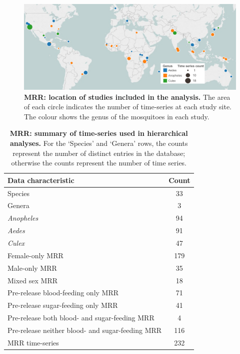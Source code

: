 \documentclass[12pt]{article}
\begin{document}
\begin{figure}[h]
	\centerline{\includegraphics[width=1.25\textwidth]{./Figure_files/mrr_mapGenusCropped.pdf}}
	\caption{\textbf{MRR: location of studies included in the analysis.} The area of each circle indicates the number of time-series at each study site. The colour shows the genus of the mosquitoes in each study.}
	\label{fig:mrr_lifetimes_map}
\end{figure}


\begin{table}[htbp]
	\centering
	\begin{tabular}{lc}
		\toprule
		\textbf{Data characteristic} & \textbf{Count} \\
		\midrule
		Species & 33 \\
		Genera & 3 \\
		\textit{Anopheles} & 94 \\
		\textit{Aedes} & 91 \\
		\textit{Culex} & 47 \\
		Female-only MRR & 179 \\
		Male-only MRR & 35 \\
		Mixed sex MRR & 18 \\
		Pre-release blood-feeding only MRR & 71 \\
		Pre-release sugar-feeding only MRR & 41 \\
		Pre-release both blood- and sugar-feeding MRR & 4 \\
		Pre-release neither blood- and sugar-feeding MRR & 116 \\
		MRR time-series & 232 \\
		\bottomrule
	\end{tabular}%
	\caption{\textbf{MRR: summary of time-series used in hierarchical analyses.} For the `Species' and `Genera' rows, the counts represent the number of distinct entries in the database; otherwise the counts represent the number of time series.}
	\label{tab:mrr_aggregateData}%
\end{table}%
\end{document}
